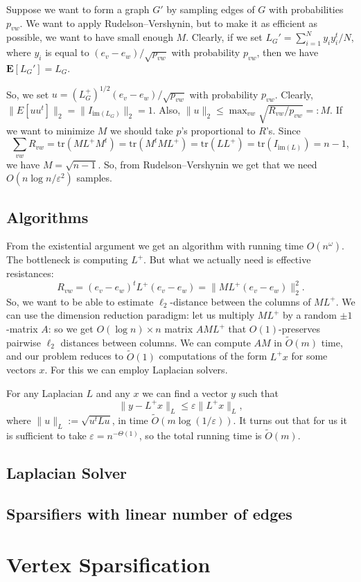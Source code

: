 \documentclass[12pt]{article}
\newcommand{\eps}{\varepsilon}
\begin{document}
    Suppose we want to form a graph $G'$ by sampling edges of $G$ with probabilities
    $p_{vw}$.
    We want to apply Rudelson--Vershynin, but to make it as efficient as possible, we want
    to have small enough $M$.
    Clearly, if we set $L_G' = \sum_{i=1}^N y_i y_i^t / N$, where $y_i$ is equal to
    $(e_v - e_w) / \sqrt{p_{vw}}$ with probability $p_{vw}$, then we have
    $\mathbf{E}[L_G'] = L_G$.

    So, we set $u = (L_G^+)^{1/2} (e_v - e_w) / \sqrt{p_{vw}}$ with probability $p_{vw}$.
    Clearly, $\|E[uu^t]\|_2 = \|I_{\mathrm{im}(L_G)}\|_2 = 1$. Also,
    $\|u\|_2 \leq \max_{vw} \sqrt{R_{vw} / p_{vw}} =: M$.
    If we want to minimize $M$ we should take $p$'s proportional to $R$'s.
    Since
    $$
        \sum_{vw} R_{vw} = \mathrm{tr}(ML^+M^t) = \mathrm{tr}(M^tML^+) =
        \mathrm{tr}(LL^+) = \mathrm{tr}(I_{\mathrm{im}(L)}) = n - 1,
    $$
    we have $M = \sqrt{n - 1}$. So, from Rudelson--Vershynin we get that we need
    $O(n \log n / \eps^2)$ samples.

    \subsection{Algorithms}

    From the existential argument we get an algorithm with running time $O(n^{\omega})$.
    The bottleneck is computing $L^+$.
    But what we actually need is effective resistances:
    $$
        R_{vw} = (e_v - e_w)^t L^+ (e_v - e_w) = \|ML^+ (e_v - e_w)\|_2^2.
    $$
    So, we want to be able to estimate $\ell_2$-distance between the columns of
    $ML^+$. We can use the dimension reduction paradigm: let us multiply $ML^+$ by
    a random $\pm 1$-matrix $A$: so we get $O(\log n) \times n$ matrix $AML^+$ that
    $O(1)$-preserves pairwise $\ell_2$ distances between columns.
    We can compute $AM$ in $\tilde{O}(m)$ time, and our problem reduces to $\tilde{O}(1)$
    computations of the form $L^+ x$ for some vectors $x$. For this we can employ
    Laplacian solvers.

    For any Laplacian $L$ and any $x$ we can find a vector $y$ such that
    $$
        \|y - L^+x\|_L \leq \eps \|L^+x\|_L,
    $$
    where $\|u\|_L := \sqrt{u^t L u}$, in time $\tilde{O}(m \log(1 / \eps))$. It turns out
    that for us it is sufficient to take $\eps = n^{-\Theta(1)}$, so the total running time
    is $\tilde{O}(m)$.

    \subsection{Laplacian Solver}

    \subsection{Sparsifiers with linear number of edges}
    \cite{BSS09}

    \section{Vertex Sparsification}
    
    
\end{document}
